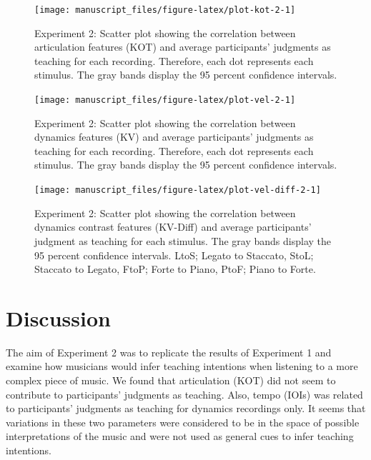\documentclass[
  man,floatsintext]{apa6}
\begin{document}
\begin{figure}

{\centering \texttt{[image: manuscript\_files/figure-latex/plot-kot-2-1]} 

}

\caption{\label{fig:kot-2}Experiment 2: Scatter plot showing the correlation between articulation features (KOT) and average participants' judgments as teaching for each recording. Therefore, each dot represents each stimulus. The gray bands display the 95 percent confidence intervals.}\label{fig:plot-kot-2}
\end{figure}

\begin{figure}

{\centering \texttt{[image: manuscript\_files/figure-latex/plot-vel-2-1]} 

}

\caption{\label{fig:vel-2}Experiment 2: Scatter plot showing the correlation between dynamics features (KV) and average participants' judgments as teaching for each recording. Therefore, each dot represents each stimulus. The gray bands display the 95 percent confidence intervals.}\label{fig:plot-vel-2}
\end{figure}

\begin{figure}

{\centering \texttt{[image: manuscript\_files/figure-latex/plot-vel-diff-2-1]} 

}

\caption{\label{fig:vel-diff-2}Experiment 2: Scatter plot showing the correlation between dynamics contrast features (KV-Diff) and average participants' judgment as teaching for each stimulus. The gray bands display the 95 percent confidence intervals. LtoS; Legato to Staccato, StoL; Staccato to Legato, FtoP; Forte to Piano, PtoF; Piano to Forte.}\label{fig:plot-vel-diff-2}
\end{figure}

\hypertarget{discussion-1}{%
\section{Discussion}\label{discussion-1}}

The aim of Experiment 2 was to replicate the results of Experiment 1 and examine how musicians would infer teaching intentions when listening to a more complex piece of music. We found that articulation (KOT) did not seem to contribute to participants' judgments as teaching. Also, tempo (IOIs) was related to participants' judgments as teaching for dynamics recordings only. It seems that variations in these two parameters were considered to be in the space of possible interpretations of the music and were not used as general cues to infer teaching intentions.
\end{document}
